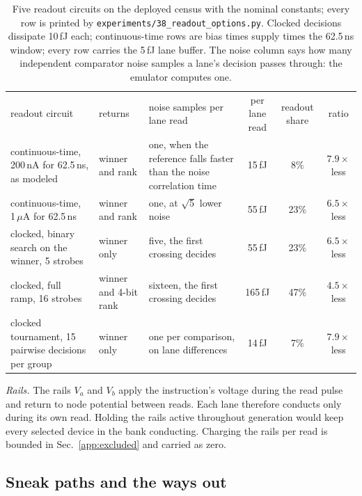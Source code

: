 \documentclass[reprint,amsmath,amssymb,aps,nofootinbib]{revtex4-2}
\begin{document}
\begin{table}
\caption{Five readout circuits on the deployed census with the
nominal constants; every row is printed by
\texttt{experiments/38\_readout\_options.py}. Clocked decisions dissipate
10\,fJ each; continuous-time rows are bias times supply times the
62.5\,ns window; every row carries the 5\,fJ lane buffer. The noise
column says how many independent comparator noise samples a lane's
decision passes through: the emulator computes one.\label{tab:readout}}
\footnotesize
\begin{ruledtabular}
\begin{tabular}{>{\raggedright\arraybackslash}p{4.6cm}>{\raggedright\arraybackslash}p{2.6cm}>{\raggedright\arraybackslash}p{3.6cm}ccc}
readout circuit & returns & noise samples per lane read & per lane read
  & readout share & ratio \\
\colrule
continuous-time, 200\,nA for 62.5\,ns, as modeled & winner and rank &
  one, when the reference falls faster than the noise correlation time
  & 15\,fJ & 8\% & $7.9\times$ less \\
continuous-time, 1\,$\mu$A for 62.5\,ns & winner and rank & one, at
  $\sqrt{5}$ lower noise & 55\,fJ & 23\% & $6.5\times$ less \\
clocked, binary search on the winner, 5 strobes & winner only & five,
  the first crossing decides & 55\,fJ & 23\% & $6.5\times$ less \\
clocked, full ramp, 16 strobes & winner and 4-bit rank & sixteen, the
  first crossing decides & 165\,fJ & 47\% & $4.5\times$ less \\
clocked tournament, 15 pairwise decisions per group & winner only & one
  per comparison, on lane differences & 14\,fJ & 7\% & $7.9\times$ less \\
\end{tabular}
\end{ruledtabular}
\end{table}

\emph{Rails.} The rails $V_a$ and $V_b$ apply the instruction's voltage
during the read pulse and return to node potential between reads. Each
lane therefore conducts only during its own read. Holding the rails
active throughout generation would keep every selected device in the
bank conducting. Charging the rails per read is bounded in
Sec.~\ref{app:excluded} and carried as zero.

\subsection{Sneak paths and the ways out}\label{app:sneak}
\end{document}

